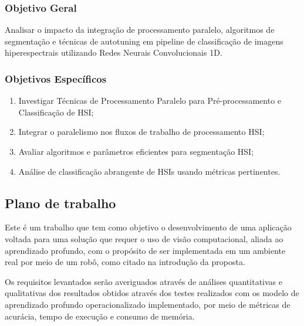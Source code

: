 \documentclass[a4paper,12pt,brazil]{article} %
\begin{document}
\bigskip
\subsubsection{Objetivo Geral}

Analisar o impacto da integração de processamento paralelo, algoritmos de segmentação e técnicas de autotuning em pipeline de classificação de imagens hiperespectrais utilizando Redes Neurais Convolucionais 1D.


\bigskip
\subsubsection{Objetivos Específicos}

\begin{enumerate}
    \item Investigar Técnicas de Processamento Paralelo para Pré-processamento e Classificação de HSI;

    \item Integrar o paralelismo nos fluxos de trabalho de processamento HSI;
    
    \item Avaliar algoritmos e parâmetros eficientes para segmentação HSI;
    
    \item Análise de classificação abrangente de HSIs usando métricas pertinentes.
    
\end{enumerate}

\bigskip

\subsection{Plano de trabalho}

Este é um trabalho que tem como objetivo o desenvolvimento de uma aplicação voltada para uma solução que requer o uso de visão computacional, aliada ao aprendizado profundo, com o propósito de ser implementada em um ambiente real por meio de um robô, como citado na introdução da proposta.

Os requisitos levantados serão averiguados através de análises quantitativas e qualitativas dos resultados obtidos através dos testes realizados com os modelo de aprendizado profundo operacionalizado implementado, por meio de métricas de acurácia, tempo de execução e consumo de memória.

\end{document}
